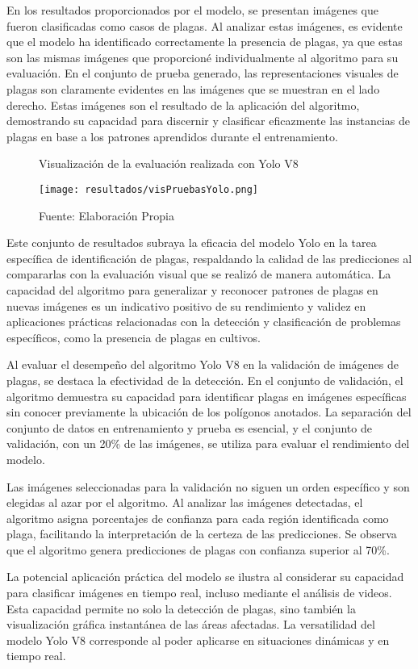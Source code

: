 En los resultados proporcionados por el modelo, se presentan imágenes que fueron clasificadas como casos de plagas. Al analizar estas imágenes, es evidente que el modelo ha identificado correctamente la presencia de plagas, ya que estas son las mismas imágenes que proporcioné individualmente al algoritmo para su evaluación. En el conjunto de prueba generado, las representaciones visuales de plagas son claramente evidentes en las imágenes que se muestran en el lado derecho. Estas imágenes son el resultado de la aplicación del algoritmo, demostrando su capacidad para discernir y clasificar eficazmente las instancias de plagas en base a los patrones aprendidos durante el entrenamiento.

\newpage

\begin{figure}[h]
\centering
\caption{Visualización de la evaluación realizada con Yolo V8}
\texttt{[image: resultados/visPruebasYolo.png]}
\caption*{\footnotesize Fuente: Elaboración Propia}
\label{fig:figuraVisPruebasYolo}
\end{figure}

Este conjunto de resultados subraya la eficacia del modelo Yolo en la tarea específica de identificación de plagas, respaldando la calidad de las predicciones al compararlas con la evaluación visual que se realizó de manera automática. La capacidad del algoritmo para generalizar y reconocer patrones de plagas en nuevas imágenes es un indicativo positivo de su rendimiento y validez en aplicaciones prácticas relacionadas con la detección y clasificación de problemas específicos, como la presencia de plagas en cultivos.

Al evaluar el desempeño del algoritmo Yolo V8 en la validación de imágenes de plagas, se destaca la efectividad de la detección. En el conjunto de validación, el algoritmo demuestra su capacidad para identificar plagas en imágenes específicas sin conocer previamente la ubicación de los polígonos anotados. La separación del conjunto de datos en entrenamiento y prueba es esencial, y el conjunto de validación, con un 20\% de las imágenes, se utiliza para evaluar el rendimiento del modelo.

\newpage

Las imágenes seleccionadas para la validación no siguen un orden específico y son elegidas al azar por el algoritmo. Al analizar las imágenes detectadas, el algoritmo asigna porcentajes de confianza para cada región identificada como plaga, facilitando la interpretación de la certeza de las predicciones. Se observa que el algoritmo genera predicciones de plagas con confianza superior al 70\%.

La potencial aplicación práctica del modelo se ilustra al considerar su capacidad para clasificar imágenes en tiempo real, incluso mediante el análisis de videos. Esta capacidad permite no solo la detección de plagas, sino también la visualización gráfica instantánea de las áreas afectadas. La versatilidad del modelo Yolo V8 corresponde al poder aplicarse en situaciones dinámicas y en tiempo real.